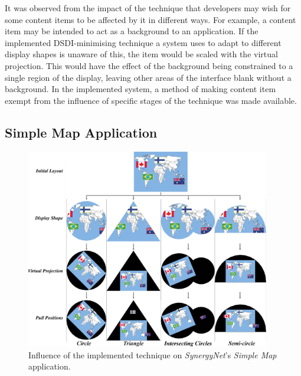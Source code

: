 \documentclass[twocolumn,compsoc]{cvm}
\begin{document}
{It was observed from the impact of the technique that developers may wish for some content items to be affected by it in different ways.
For example, a content item may be intended to act as a background to an application.
If the implemented \ac{DSDI}-minimising technique a system uses to adapt to different display shapes is unaware of this, the item would be scaled with the virtual projection.
This would have the effect of the background being constrained to a single region of the display, leaving other areas of the interface blank without a background.
In the implemented system, a method of making content item exempt from the influence of specific stages of the technique was made available.


\subsection{Simple Map Application}
\label{subsec:simplemapresults} 


\begin{figure}[h!] 
 \centering
  \includegraphics[width=0.95\textwidth]{figures/MapApplication.jpeg}
  \caption{Influence of the implemented technique on {\emph{SynergyNet}}'s {\emph{Simple Map}} application.}
  \label{fig:mapApp}
\end{figure}

}
\end{document}
